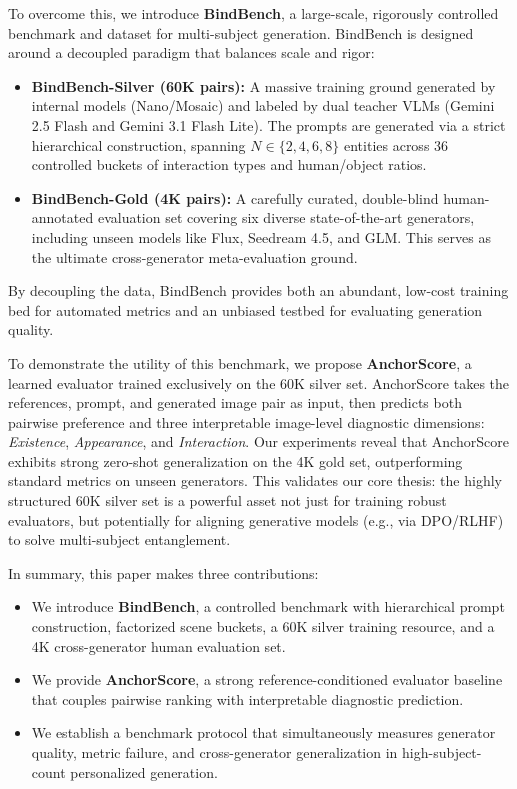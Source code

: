 To overcome this, we introduce \textbf{BindBench}, a large-scale, rigorously controlled benchmark and dataset for multi-subject generation. BindBench is designed around a decoupled paradigm that balances scale and rigor:
\begin{itemize}
    \item \textbf{BindBench-Silver (60K pairs):} A massive training ground generated by internal models (Nano/Mosaic) and labeled by dual teacher VLMs (Gemini 2.5 Flash and Gemini 3.1 Flash Lite). The prompts are generated via a strict hierarchical construction, spanning $N \in \{2,4,6,8\}$ entities across 36 controlled buckets of interaction types and human/object ratios.
    \item \textbf{BindBench-Gold (4K pairs):} A carefully curated, double-blind human-annotated evaluation set covering six diverse state-of-the-art generators, including unseen models like Flux, Seedream 4.5, and GLM. This serves as the ultimate cross-generator meta-evaluation ground.
\end{itemize}

By decoupling the data, BindBench provides both an abundant, low-cost training bed for automated metrics and an unbiased testbed for evaluating generation quality. 

To demonstrate the utility of this benchmark, we propose \textbf{AnchorScore}, a learned evaluator trained exclusively on the 60K silver set. AnchorScore takes the references, prompt, and generated image pair as input, then predicts both pairwise preference and three interpretable image-level diagnostic dimensions: \emph{Existence}, \emph{Appearance}, and \emph{Interaction}. Our experiments reveal that AnchorScore exhibits strong zero-shot generalization on the 4K gold set, outperforming standard metrics on unseen generators. This validates our core thesis: the highly structured 60K silver set is a powerful asset not just for training robust evaluators, but potentially for aligning generative models (e.g., via DPO/RLHF) to solve multi-subject entanglement.

In summary, this paper makes three contributions:
\begin{itemize}
    \item We introduce \textbf{BindBench}, a controlled benchmark with hierarchical prompt construction, factorized scene buckets, a 60K silver training resource, and a 4K cross-generator human evaluation set.
    \item We provide \textbf{AnchorScore}, a strong reference-conditioned evaluator baseline that couples pairwise ranking with interpretable diagnostic prediction.
    \item We establish a benchmark protocol that simultaneously measures generator quality, metric failure, and cross-generator generalization in high-subject-count personalized generation.
\end{itemize}

